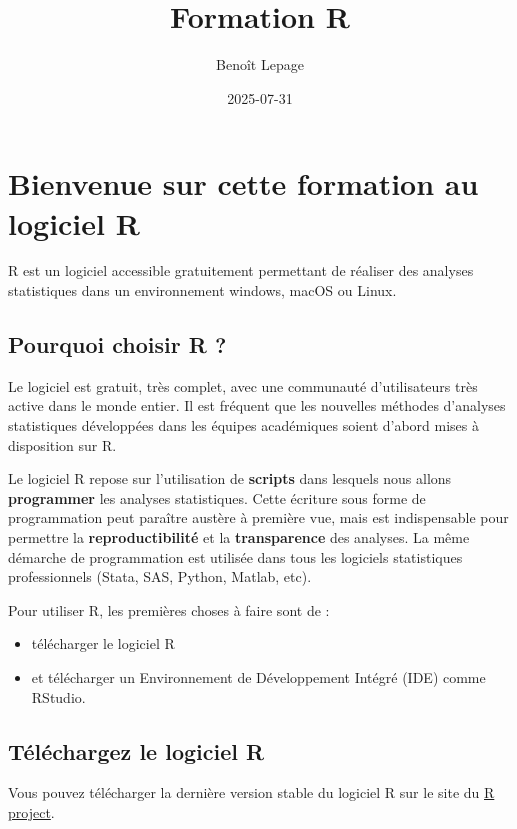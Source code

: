 \documentclass[
]{book}
\title{Formation R}
\author{Benoît Lepage}
\date{2025-07-31}
\providecommand{\tightlist}{%
  \setlength{\itemsep}{0pt}\setlength{\parskip}{0pt}}
\begin{document}
\maketitle

{
\setcounter{tocdepth}{1}
\tableofcontents
}
\chapter{Bienvenue sur cette formation au logiciel R}\label{bienvenue-sur-cette-formation-au-logiciel-r}

R est un logiciel accessible gratuitement permettant de réaliser des analyses statistiques dans un environnement windows, macOS ou Linux.

\section{Pourquoi choisir R ?}\label{pourquoi-choisir-r}

Le logiciel est gratuit, très complet, avec une communauté d'utilisateurs très active dans le monde entier. Il est fréquent que les nouvelles méthodes d'analyses statistiques développées dans les équipes académiques soient d'abord mises à disposition sur R.

Le logiciel R repose sur l'utilisation de \textbf{scripts} dans lesquels nous allons \textbf{programmer} les analyses statistiques. Cette écriture sous forme de programmation peut paraître austère à première vue, mais est indispensable pour permettre la \textbf{reproductibilité} et la \textbf{transparence} des analyses. La même démarche de programmation est utilisée dans tous les logiciels statistiques professionnels (Stata, SAS, Python, Matlab, etc).

Pour utiliser R, les premières choses à faire sont de :

\begin{itemize}
\tightlist
\item
  télécharger le logiciel R
\item
  et télécharger un Environnement de Développement Intégré (IDE) comme RStudio.
\end{itemize}

\section{Téléchargez le logiciel R}\label{tuxe9luxe9chargez-le-logiciel-r}

Vous pouvez télécharger la dernière version stable du logiciel R sur le site du \href{https://www.r-project.org/}{R project}.
\end{document}
